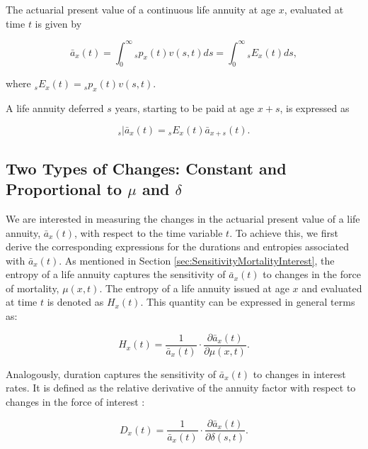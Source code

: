 \documentclass[12pt]{article}
\begin{document}
The actuarial present value of a continuous life annuity at age $x$, evaluated at time $t$ is given by

\begin{equation}\label{eq:Annuity}
\bar{a}_x(t) = \int_0^\infty {}_sp_x(t) {v}(s,t)ds = \int_0^\infty {}_sE_x(t) ds,
\end{equation}

where ${}_sE_x(t)={}_sp_x(t) {v}(s,t)$. 

A life annuity deferred $s$ years, starting to be paid at age $x+s$, is expressed as

\begin{equation}\label{eq:DefAnnuity}
{}_s|\bar{a}_x(t) = {}_sE_x(t) \bar{a}_{x+s}(t).
\end{equation}


\subsection{Two Types of Changes: Constant and Proportional to $\mu$ and $\delta$}



We are interested in measuring the changes in the actuarial present value of a life annuity, \( \bar{a}_x(t) \), with respect to the time variable \( t \). To achieve this, we first derive the corresponding expressions for the durations and entropies associated with \( \bar{a}_x(t) \). As mentioned in Section \ref{sec:SensitivityMortalityInterest}, the entropy of a life annuity captures the sensitivity of \( \bar{a}_x(t) \) to changes in the force of mortality, \( \mu(x,t) \). The entropy of a life annuity issued at age \( x \) and evaluated at time \( t \) is denoted as \( H_x(t) \). This quantity can be expressed in general terms as:

\begin{equation}\label{eq:EntropyGeneral}
{H}_{x}(t) = \frac{ 1}{\bar{a}_x(t)}\cdot \frac{\partial \bar{a}_x(t) }{\partial \mu(x,t)}.
\end{equation}

Analogously, duration captures the sensitivity of $\bar{a}_x(t)$ to changes in interest rates. It is defined as the relative derivative of the annuity factor with respect to changes in the force of interest \citep{Milevsky2012,Milevsky2012a}:


\begin{equation}\label{eq:DurationGeneral}
{D}_{x}(t) = \frac{1}{\bar{a}_x(t)}\cdot  \frac{\partial \bar{a}_x(t) }{\partial \delta(s,t)}.
\end{equation}
\end{document}

